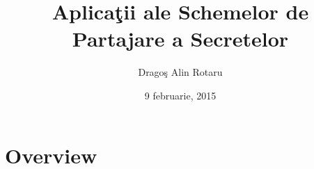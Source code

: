 \documentclass{beamer}
\title[Universitatea din Bucure\c{s}ti]{Aplica\c{t}ii ale Schemelor de Partajare a Secretelor}
\author[Drago\c{s} Alin Rotaru]{Drago\c{s} Alin Rotaru} %
\institute[UniBuc] %
{
Universitatea din Bucure\c{s}ti\\ %
}
\date{9 februarie, 2015} %
\begin{document}
\begin{frame}
\titlepage %
\end{frame}



\section{Overview} %
\end{document}
